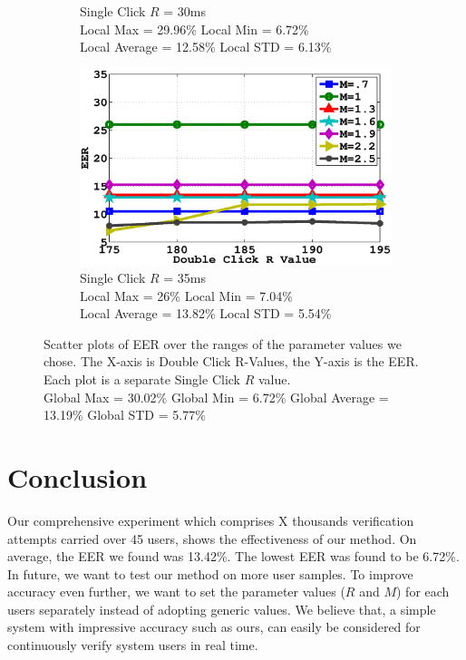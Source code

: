 \documentclass[conference]{IEEEtran}
\begin{document}
\begin{figure}[b!]
\begin{subfigure}{.5\textwidth}
  \caption{Single Click $R$ = 30ms \\Local Max = 29.96\% Local Min = 6.72\% \\Local Average = 12.58\% Local STD = 6.13\%}
  \label{fig:sfig3}
\end{subfigure}%
\begin{subfigure}{.5\textwidth}
  \centering
  \includegraphics[width=.8\linewidth]{35.eps}
  \caption{Single Click $R$ = 35ms \\Local Max = 26\% Local Min = 7.04\%\\Local Average = 13.82\% Local STD = 5.54\%}
  \label{fig:sfig4}
\end{subfigure}
\caption{Scatter plots of EER over the ranges of the parameter values we chose. The X-axis is Double Click R-Values, the Y-axis is the EER. Each plot is a separate Single Click $R$ value. \\Global Max = 30.02\% Global Min = 6.72\% Global Average = 13.19\% Global STD = 5.77\%}
\label{fig:fig}
\end{figure}


\section{Conclusion}

Our comprehensive experiment which comprises X thousands verification attempts carried over 45 users, shows the effectiveness of our method. On average, the EER we found was 13.42\%. The lowest EER was found to be 6.72\%. In future, we want to test our method on more user samples. To improve accuracy even further, we want to set the parameter values ($R$ and $M$) for each users separately instead of adopting generic values. We believe that, a simple system with impressive accuracy such as ours, can easily be considered for continuously verify system users in real time.    
\end{document}
